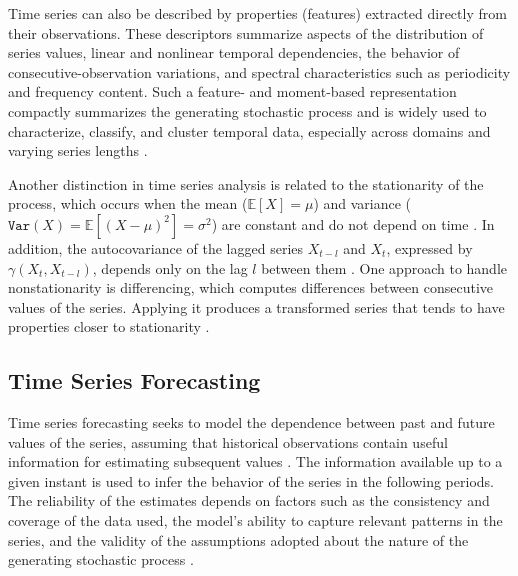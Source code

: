 \documentclass[final,3p,times,twocolumn,authoryear]{elsarticle}
\begin{document}
Time series can also be described by properties (features) extracted directly from their observations. These descriptors summarize aspects of the distribution of series values, linear and nonlinear temporal dependencies, the behavior of consecutive-observation variations, and spectral characteristics such as periodicity and frequency content. Such a feature- and moment-based representation \citep{lubba_catch22_2019} compactly summarizes the generating stochastic process and is widely used to characterize, classify, and cluster temporal data, especially across domains and varying series lengths \citep{fulcher_highly_2014}.

Another distinction in time series analysis is related to the stationarity of the process, which occurs when the mean ($\mathbb{E}[X] = \mu$) and variance ($\texttt{Var}(X) = \mathbb{E}[(X-\mu)^2] = \sigma^2$) are constant and do not depend on time \citep{shumway_time_2017, gujarati_essentials_2021}. In addition, the autocovariance of the lagged series $X_{t-l}$ and $X_t$, expressed by $\gamma(X_t, X_{t-l})$, depends only on the lag $l$ between them \citep{ogasawara_event_2025}. One approach to handle nonstationarity is differencing, which computes differences between consecutive values of the series. Applying it produces a transformed series that tends to have properties closer to stationarity \citep{salles_nonstationary_2019}.

\subsection{Time Series Forecasting}
\label{sec_process}

Time series forecasting seeks to model the dependence between past and future values of the series, assuming that historical observations contain useful information for estimating subsequent values \citep{han_data_2012}. The information available up to a given instant is used to infer the behavior of the series in the following periods. The reliability of the estimates depends on factors such as the consistency and coverage of the data used, the model's ability to capture relevant patterns in the series, and the validity of the assumptions adopted about the nature of the generating stochastic process \citep{hyndman_forecasting_2021, gujarati_essentials_2021}.
\end{document}
